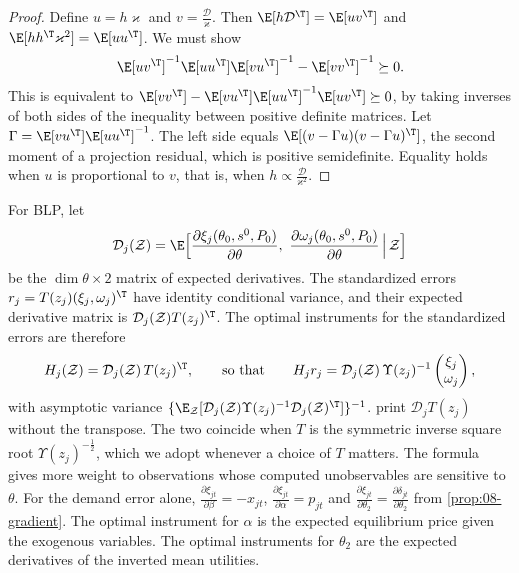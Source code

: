 \begin{proof}
Define $u = h\varkappa$ and $v = \frac{\mathcal{D}}{\varkappa}$. Then $\E[h\mathcal{D}^\T] = \E[uv^\T]$ and
$\E[hh^\T\varkappa^2] = \E[uu^\T]$. We must show
\begin{equation*}
  \E[uv^\T]^{-1}\E[uu^\T]\E[vu^\T]^{-1} - \E[vv^\T]^{-1} \succeq 0.
\end{equation*}
This is equivalent to $\E[vv^\T] - \E[vu^\T]\E[uu^\T]^{-1}\E[uv^\T] \succeq 0$, by taking inverses of both
sides of the inequality between positive definite matrices. Let $\Gamma = \E[vu^\T]\E[uu^\T]^{-1}$. The left
side equals $\E[(v - \Gamma u)(v - \Gamma u)^\T]$, the second moment of a projection residual, which is
positive semidefinite. Equality holds when $u$ is proportional to $v$, that is, when $h \propto
\frac{\mathcal{D}}{\varkappa^2}$.
\end{proof}

For BLP, let
\begin{equation*}
  \mathcal{D}_j(\mathcal{Z}) = \E\Big[\frac{\partial \xi_j(\theta_0, s^0, P_0)}{\partial \theta},\ \frac{\partial
  \omega_j(\theta_0, s^0, P_0)}{\partial \theta} \,\Big|\, \mathcal{Z}\Big]
\end{equation*}
be the $\dim\theta \times 2$ matrix of expected derivatives. The standardized errors $r_j = T(z_j)(\xi_j,
\omega_j)^\T$ have identity conditional variance, and their expected derivative matrix is
$\mathcal{D}_j(\mathcal{Z})T(z_j)^\T$. The optimal instruments for the standardized errors are therefore
\begin{equation*}
  H_j(\mathcal{Z}) = \mathcal{D}_j(\mathcal{Z})\,T(z_j)^\T, \qquad\text{so that}\qquad H_j r_j =
  \mathcal{D}_j(\mathcal{Z})\,\Upsilon(z_j)^{-1}\begin{pmatrix}\xi_j\\ \omega_j\end{pmatrix},
\end{equation*}
with asymptotic variance $\{\E_{\mathcal Z}[\mathcal{D}_j(\mathcal{Z})\Upsilon(z_j)^{-1}
\mathcal{D}_j(\mathcal{Z})^\T]\}^{-1}$. \citet[eq.~5.7]{BerryLevinsohnPakes1995} print $\mathcal{D}_j T(z_j)$
without the transpose. The two coincide when $T$ is the symmetric inverse square root
$\Upsilon(z_j)^{-\frac{1}{2}}$, which we adopt whenever a choice of $T$ matters. The formula gives more weight
to observations whose computed
unobservables are sensitive to $\theta$. For the demand error alone, $\frac{\partial \xi_{jt}}{\partial \beta}
= -x_{jt}$, $\frac{\partial \xi_{jt}}{\partial \alpha} = p_{jt}$ and $\frac{\partial \xi_{jt}}{\partial
\theta_2} = \frac{\partial \delta_{jt}}{\partial \theta_2}$ from \cref{prop:08-gradient}. The optimal
instrument for $\alpha$ is the expected equilibrium price given the exogenous variables. The optimal
instruments for $\theta_2$ are the expected derivatives of the inverted mean utilities.

